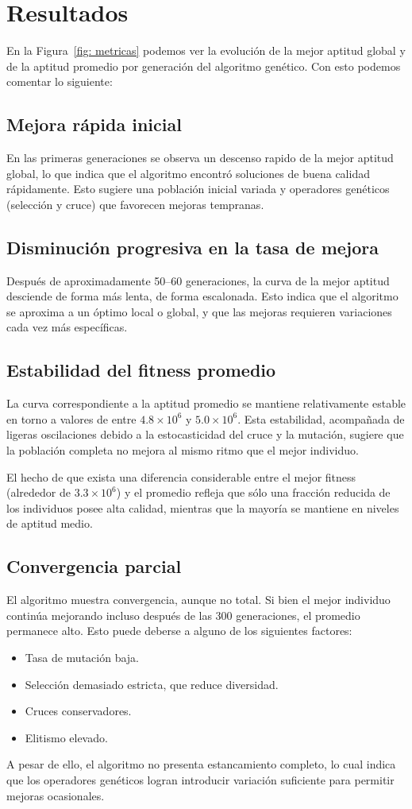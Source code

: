 \section{Resultados}

En la Figura~\ref{fig: metricas} podemos ver la evolución de la mejor aptitud global y de la aptitud promedio por generación del algoritmo genético. 
Con esto podemos comentar lo siguiente:

\subsection{Mejora rápida inicial}
En las primeras generaciones se observa un descenso rapido de la mejor aptitud global, lo que indica que el algoritmo encontró soluciones 
de buena calidad rápidamente. Esto sugiere una población inicial variada y operadores genéticos (selección y cruce) 
que favorecen mejoras tempranas.

\subsection{Disminución progresiva en la tasa de mejora}
Después de aproximadamente 50--60 generaciones, la curva de la mejor aptitud desciende de forma más lenta, de forma escalonada. 
Esto indica que el algoritmo se aproxima a un óptimo local o global, y que las mejoras requieren variaciones cada vez más específicas. 

\subsection{Estabilidad del fitness promedio}
La curva correspondiente a la aptitud promedio se mantiene relativamente estable en torno a valores de entre $4.8 \times 10^6$ y $5.0 \times 10^6$.
Esta estabilidad, acompañada de ligeras oscilaciones debido a la estocasticidad del cruce y la mutación, sugiere que la población completa 
no mejora al mismo ritmo que el mejor individuo.

El hecho de que exista una diferencia considerable entre el mejor fitness (alrededor de $3.3 \times 10^6$) y el promedio refleja que 
sólo una fracción reducida de los individuos posee alta calidad, mientras que la mayoría se mantiene en niveles de aptitud medio. 

\subsection{Convergencia parcial}
El algoritmo muestra convergencia, aunque no total. Si bien el mejor individuo continúa mejorando incluso después de las 300 generaciones, 
el promedio permanece alto. Esto puede deberse a alguno de los siguientes factores:
\begin{itemize}
    \item Tasa de mutación baja.
    \item Selección demasiado estricta, que reduce diversidad.
    \item Cruces conservadores.
    \item Elitismo elevado.
\end{itemize}

A pesar de ello, el algoritmo no presenta estancamiento completo, lo cual indica que los operadores genéticos logran introducir variación 
suficiente para permitir mejoras ocasionales.
